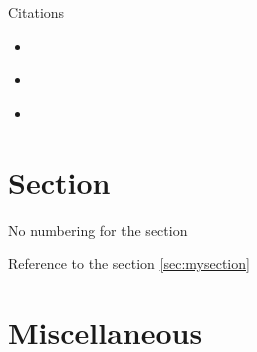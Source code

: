 \documentclass[table]{beamer}
\begin{document}
\begin{frame}[label={sec:org0e6a922}]{Citations}
\begin{itemize}
\item \citep{pearson1905problem}
\item \cite{pearson1905problem}
\item \citep[xx]{pearson1905problem}
\end{itemize}
\cite[p.~150]{pearson1905problem}
\end{frame}

\section{Section}
\label{sec:orgc61de02}
\begin{frame}[label={sec:org04df8aa}]{No numbering for the section}
\end{frame}

\begin{frame}[label={sec:mysection}]{Reference to the section}
\ref{sec:mysection}
\end{frame}

\section{Miscellaneous}
\label{sec:org689be8b}
\end{document}
